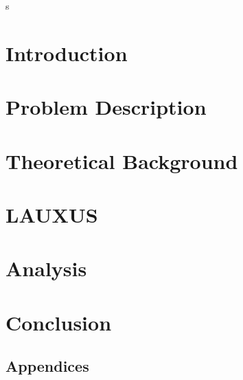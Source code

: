 \documentclass[main.tex]{subfiles}
\begin{document}
s\chapter{Introduction}
\label{chapter:introduction}



\chapter{Problem Description}
\label{chapter:problem}






\chapter{Theoretical Background}
\label{chapter:theoric}





\chapter{LAUXUS}
\label{chapter:lauxus}










\chapter{Analysis}
\label{chapter:lauxus}






\chapter{Conclusion}
\label{chapter:conclusion}



\nocite{*}




\appendix
\section*{Appendices}
\renewcommand{\thesection}{\Alph{section}}

\end{document}
